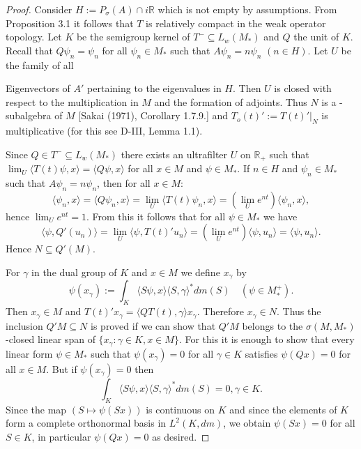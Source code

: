 \begin{proof}
Consider $H := P_{\sigma}(A) \cap i\mathbb{R}$ which is not empty by assumptions.
From Proposition 3.1 it follows that $T$ is relatively compact in the weak operator topology.
Let $K$ be the semigroup kernel of $T^{-} \subseteq L_{w}(M_{*})$ and $Q$ the unit of $K$.
Recall that $Q\psi_{n} = \psi_{n}$ for all $\psi_{n} \in M_{*}$ such that $A\psi_{n} = n\psi_{n}$ $(n \in H)$.
Let $U$ be the family of all

\newpage

Eigenvectors of $A'$ pertaining to the eigenvalues in $H$.
Then $U$ is closed with respect to the multiplication in $M$ and the formation of adjoints.
Thus $N$ is a \WA-subalgebra of $M$ [Sakai (1971), Corollary 1.7.9.] and $T_{o}(t)' := T(t)'|_{N}$ is multiplicative (for this see D-III, Lemma 1.1).

Since $Q \in T^{-} \subseteq L_{w}(M_{*})$ there exists an ultrafilter $U$ on $\mathbb{R}_{+}$ such that $\lim_{U}\langle T(t)\psi,x\rangle = \langle Q\psi,x\rangle$ for all $x \in M$ and $\psi \in M_{*}$.
If $n \in H$ and $\psi_{n} \in M_{*}$ such that $A\psi_{n} = n\psi_{n}$, then for all $x \in M$:
\[
\langle\psi_{n},x\rangle = \langle Q\psi_{n},x\rangle = \lim_{U} \langle T(t)\psi_{n},x\rangle = (\lim_{U} e^{nt})\langle\psi_{n},x\rangle,
\]
hence $\lim_{U} e^{nt} = 1$.
From this it follows that for all $\psi \in M_{*}$ we have
\[
\langle\psi,Q'(u_{n})\rangle = \lim_{U} \langle\psi,T(t)'u_{n}\rangle = (\lim_{U} e^{nt})\langle\psi,u_{n}\rangle = \langle\psi,u_{n}\rangle.
\]
Hence $N \subseteq Q'(M)$.

For $\gamma$ in the dual group of $K$ and $x \in M$ we define $x_{\gamma}$ by
\[
\psi(x_{\gamma}) := \int_{K} \langle S\psi,x\rangle\langle S,\gamma\rangle^* dm(S) \quad (\psi \in M_{*}^{+}).
\]
Then $x_{\gamma} \in M$ and $T(t)'x_{\gamma} = \langle QT(t),\gamma\rangle x_{\gamma}$.
Therefore $x_{\gamma} \in N$.
Thus the inclusion $Q'M \subseteq N$ is proved if we can show that $Q'M$ belongs to the $\sigma(M,M_{*})$-closed linear span of $\{x_{\gamma} : \gamma \in K, x \in M\}$.
For this it is enough to show that every linear form $\psi \in M_{*}$ such that $\psi(x_{\gamma}) = 0$ for all $\gamma \in K$ satisfies $\psi(Qx) = 0$ for all $x \in M$.
But if $\psi(x_{\gamma}) = 0$ then
\[
\int_{K} \langle S\psi,x\rangle\langle S,\gamma\rangle^* dm(S) = 0, \gamma \in K.
\]
Since the map $(S \mapsto \psi(Sx))$ is continuous on $K$ and since the elements of $K$ form a complete orthonormal basis in $L^2(K,dm)$, we obtain $\psi(Sx) = 0$ for all $S \in K$, in particular $\psi(Qx) = 0$ as desired.


\end{proof}
